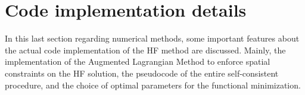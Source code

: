\section{Code implementation details}
In this last section regarding numerical methods, some important features about the actual code implementation of the HF method are discussed.
Mainly, the implementation of the Augmented Lagrangian Method to enforce spatial constraints on the HF solution, the pseudocode of the entire self-consistent procedure, and the choice of optimal parameters for the functional minimization.



